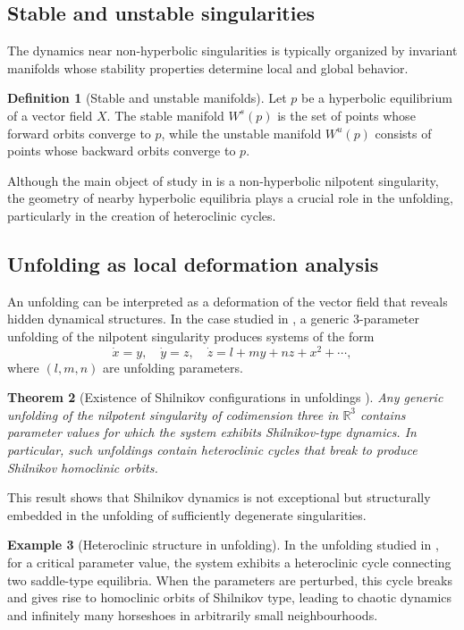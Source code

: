 \documentclass[12pt, a4paper, oneside]{book}
\theoremstyle{plain}
\newtheorem{theorem}{Theorem}[chapter]
\theoremstyle{definition}
\newtheorem{definition}[theorem]{Definition}
\newtheorem{example}[theorem]{Example}
\theoremstyle{remark}
\theoremstyle{definition}
\begin{document}
\subsection{Stable and unstable singularities}

The dynamics near non-hyperbolic singularities is typically organized by invariant manifolds whose stability properties determine local and global behavior.

\begin{definition}[Stable and unstable manifolds]
Let $p$ be a hyperbolic equilibrium of a vector field $X$. The stable manifold $W^s(p)$ is the set of points whose forward orbits converge to $p$, while the unstable manifold $W^u(p)$ consists of points whose backward orbits converge to $p$.
\end{definition}

Although the main object of study in \cite{ibanez2005shil} is a non-hyperbolic nilpotent singularity, the geometry of nearby hyperbolic equilibria plays a crucial role in the unfolding, particularly in the creation of heteroclinic cycles.

\subsection{Unfolding as local deformation analysis}

An unfolding can be interpreted as a deformation of the vector field that reveals hidden dynamical structures. In the case studied in \cite{ibanez2005shil}, a generic 3-parameter unfolding of the nilpotent singularity produces systems of the form
\[
\dot{x} = y, \quad
\dot{y} = z, \quad
\dot{z} = l + my + nz + x^2 + \cdots,
\]
where $(l,m,n)$ are unfolding parameters.

\begin{theorem}[Existence of Shilnikov configurations in unfoldings \cite{ibanez2005shil}]
Any generic unfolding of the nilpotent singularity of codimension three in $\mathbb{R}^3$ contains parameter values for which the system exhibits Shilnikov-type dynamics. In particular, such unfoldings contain heteroclinic cycles that break to produce Shilnikov homoclinic orbits.
\end{theorem}

This result shows that Shilnikov dynamics is not exceptional but structurally embedded in the unfolding of sufficiently degenerate singularities.

\begin{example}[Heteroclinic structure in unfolding]
In the unfolding studied in \cite{ibanez2005shil}, for a critical parameter value, the system exhibits a heteroclinic cycle connecting two saddle-type equilibria. When the parameters are perturbed, this cycle breaks and gives rise to homoclinic orbits of Shilnikov type, leading to chaotic dynamics and infinitely many horseshoes in arbitrarily small neighbourhoods.
\end{example}
\end{document}
